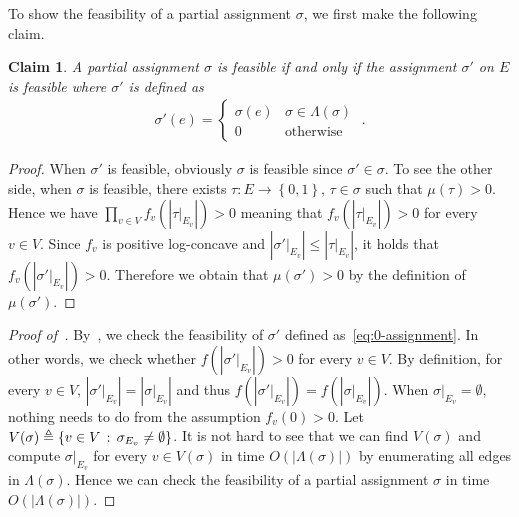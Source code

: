 \documentclass[11pt]{article}
\newtheorem{claim}[theorem]{Claim}
\newcommand{\abs}[1]{\left\vert#1\right\vert}
\newcommand{\set}[1]{\left\{#1\right\}}
\newcommand{\defeq}{\triangleq} \renewcommand{\d}{\,\-d}
\begin{document}
To show the feasibility of a partial assignment $\sigma$, we first make the following claim.
\begin{claim} \label{claim:partial-assignment-feasibility}
    A partial assignment $\sigma$ is feasible if and only if the assignment $\sigma'$ on $E$ is feasible where $\sigma'$ is defined as
    \begin{align} \label{eq:0-assignment}
        \sigma'(e) = \begin{cases}
            \sigma(e) & \sigma \in \Lambda(\sigma) \\
            0 & \mbox{otherwise}
        \end{cases}\;.
    \end{align}
\end{claim}
\begin{proof}
    When $\sigma'$ is feasible, obviously $\sigma$ is feasible since $\sigma' \in \sigma$. To see the other side, when $\sigma$ is feasible, there exists $\tau : E \to \set{0, 1}$, $\tau \in \sigma$ such that $\mu(\tau) > 0$. Hence we have $\prod_{v \in V} f_v\left(\abs{\tau \vert_{E_v}}\right) > 0$ meaning that $f_v\left(\abs{\tau \vert_{E_v}}\right) > 0$ for every $v \in V$. Since $f_v$ is positive log-concave and $\abs{\sigma' \vert_{E_v}} \le \abs{\tau \vert_{E_v}}$, it holds that $f_v\left(\abs{\sigma' \vert_{E_v}}\right) > 0$. Therefore we obtain that $\mu(\sigma') > 0$ by the definition of $\mu(\sigma')$.
\end{proof}

\begin{proof}[Proof of~]
    By~, we check the feasibility of $\sigma'$ defined as~\eqref{eq:0-assignment}. In other words, we check whether $f\left(\abs{\sigma'\vert_{E_v}}\right) > 0$ for every $v \in V$. By definition, for every $v \in V$, $\abs{\sigma' \vert_{E_v}} = \abs{\sigma \vert_{E_v}}$ and thus $f\left(\abs{\sigma' \vert_{E_v}}\right) = f\left(\abs{\sigma \vert_{E_v}}\right)$. When $\sigma \vert_{E_v} = \emptyset$, nothing needs to do from the assumption $f_v(0) > 0$. Let $V(\sigma) \defeq \set{v \in V \cmid \sigma_{E_v} \neq \emptyset}$. It is not hard to see that we can find $V(\sigma)$ and compute $\sigma \vert_{E_v}$ for every $v \in V(\sigma)$ in time $O(\abs{\Lambda(\sigma)})$ by enumerating all edges in $\Lambda(\sigma)$. Hence we can check the feasibility of a partial assignment $\sigma$ in time $O(\abs{\Lambda(\sigma)})$. 
\end{proof}
\end{document}
